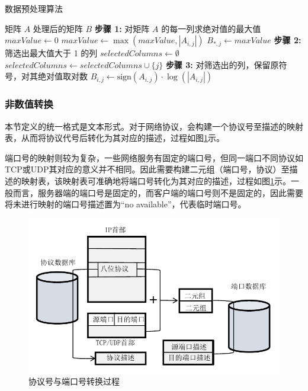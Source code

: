 \begin{algorithm}[htbp]
\caption{数据预处理算法}
\begin{algorithmic}
\REQUIRE 矩阵 $A$
\ENSURE 处理后的矩阵 $B$
\STATE \textbf{步骤 1:} 对矩阵 $A$ 的每一列求绝对值的最大值
    \STATE $maxValue \gets 0$
        \STATE $maxValue \gets \max(maxValue, |A_{i,j}|)$
    \ENDFOR
    \STATE $B_{*,j} \gets maxValue$
\ENDFOR
\STATE \textbf{步骤 2:} 筛选出最大值大于 1 的列
\STATE $selectedColumns \gets \emptyset$
        \STATE $selectedColumns \gets selectedColumns \cup \{j\}$
    \ENDIF
\ENDFOR
\STATE \textbf{步骤 3:} 对筛选出的列，保留原符号，对其绝对值取对数
        \STATE $B_{i,j} \gets \mathrm{sign}(A_{i,j}) \cdot \log(|A_{i,j}|)$
    \ENDFOR
\ENDFOR
\end{algorithmic}
\label{alg:map_gt1}
\end{algorithm}



\subsubsection{非数值转换}
本节定义的统一格式是文本形式。对于网络协议，会构建一个协议号至描述的映射表，从而将协议代号后转化为其对应的描述，过程如图\ref{fig:convert_ipport}示。

端口号的映射则较为复杂，一些网络服务有固定的端口号，但同一端口不同协议如TCP或UDP其对应的意义并不相同。因此需要构建二元组（端口号，协议）至描述的映射表，该映射表可准确地将端口号转化为其对应的描述，过程如图\ref{fig:convert_ipport}示。一般而言，服务器端的端口号是固定的，而客户端的端口号则不是固定的，因此需要将未进行映射的端口号描述置为“no available”，代表临时端口号。

\begin{figure}[htbp]
\centering %
\includegraphics[width=1\linewidth]{img/preprocessing/convert_ipport.pdf} %
\caption{协议号与端口号转换过程}
\label{fig:convert_ipport} %
\end{figure}%


